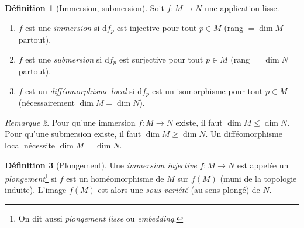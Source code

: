\documentclass[12pt,a4paper,openany]{book}
\theoremstyle{definition}
\newtheorem{definition}{Définition}[chapter]
\theoremstyle{plain}
\theoremstyle{remark}
\newtheorem{remarque}[definition]{Remarque}
\newcommand{\dd}{\mathrm{d}}
\begin{document}
\begin{definition}[Immersion, submersion]\label{def:immersion-submersion}
Soit $f \colon M \to N$ une application lisse.
\begin{enumerate}[label=(\roman*)]
    \item $f$ est une \emph{immersion} si $\dd f_p$ est injective pour tout
    $p \in M$ (rang $= \dim M$ partout).
    \item $f$ est une \emph{submersion} si $\dd f_p$ est surjective pour tout
    $p \in M$ (rang $= \dim N$ partout).
    \item $f$ est un \emph{difféomorphisme local}
    si $\dd f_p$ est un isomorphisme pour tout $p \in M$ (nécessairement
    $\dim M = \dim N$).
\end{enumerate}
\end{definition}

\begin{remarque}\label{rem:immersion-dim}
Pour qu'une immersion $f \colon M \to N$ existe, il faut $\dim M \leq \dim N$.
Pour qu'une submersion existe, il faut $\dim M \geq \dim N$. Un
difféomorphisme local nécessite $\dim M = \dim N$.
\end{remarque}

\begin{definition}[Plongement]\label{def:plongement}
Une \emph{immersion injective} $f \colon M \to N$ est appelée un
\emph{plongement}\footnote{On dit aussi \emph{plongement lisse} ou
\emph{embedding}.} si $f$ est un homéomorphisme de $M$ sur $f(M)$ (muni de
la topologie induite). L'image $f(M)$ est alors une \emph{sous-variété} (au
sens plongé) de $N$.
\end{definition}
\end{document}
